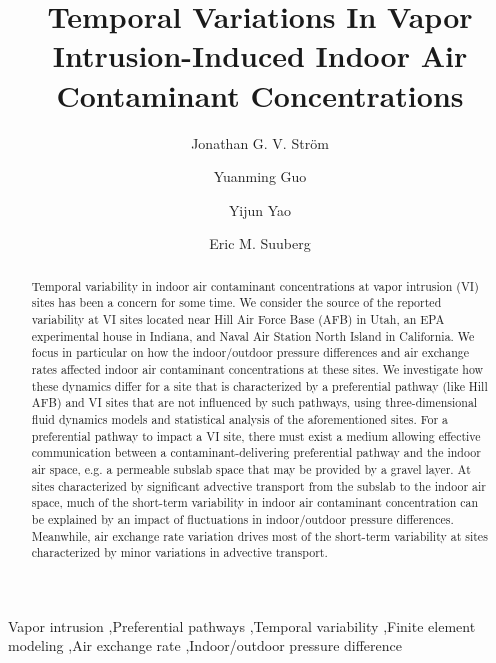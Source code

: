 \documentclass[preprint,12pt]{elsarticle}
\begin{document}
\begin{frontmatter}
\title{Temporal Variations In Vapor Intrusion-Induced Indoor Air Contaminant Concentrations}

\author[Brown]{Jonathan G. V. Ström}
\author[ASU]{Yuanming Guo}
\author[ASU]{Yijun Yao}
\author[Brown]{Eric M. Suuberg}


\address[Brown]{Brown University, School of Engineering, Providence, RI, USA}
\address[ASU]{Arizona State University, School of Sustainable Engineering and the Building Environment, Tempe, AZ, USA}

\begin{abstract}
Temporal variability in indoor air contaminant concentrations at vapor intrusion (VI) sites has been a concern for some time.
We consider the source of the reported variability at VI sites located near Hill Air Force Base (AFB) in Utah, an EPA experimental house in Indiana, and Naval Air Station North Island in California.
We focus in particular on how the indoor/outdoor pressure differences and air exchange rates affected indoor air contaminant concentrations at these sites.
We investigate how these dynamics differ for a site that is characterized by a preferential pathway (like Hill AFB) and VI sites that are not influenced by such pathways, using three-dimensional fluid dynamics models and statistical analysis of the aforementioned sites.
For a preferential pathway to impact a VI site, there must exist a medium allowing effective communication between a contaminant-delivering preferential pathway and the indoor air space, e.g. a permeable subslab space that may be provided by a gravel layer.
At sites characterized by significant advective transport from the subslab to the indoor air space, much of the short-term variability in indoor air contaminant concentration can be explained by an impact of fluctuations in indoor/outdoor pressure differences.
Meanwhile, air exchange rate variation drives most of the short-term variability at sites characterized by minor variations in advective transport.
\end{abstract}

\begin{keyword}
  Vapor intrusion \sep Preferential pathways \sep Temporal variability \sep Finite element modeling \sep Air exchange rate \sep Indoor/outdoor pressure difference
\end{keyword}

\end{frontmatter}
\end{document}
